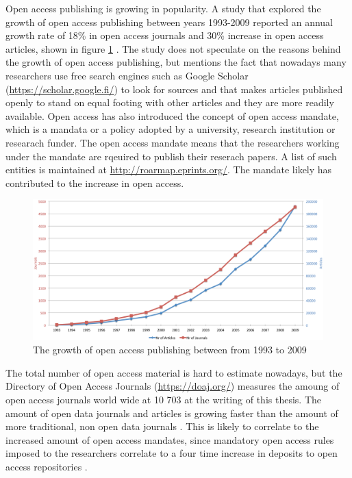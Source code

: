 Open access publishing is growing in popularity. A study that explored the
growth of open access publishing between years 1993-2009 reported an annual
growth rate of 18\% in open access journals and 30\% increase in open access
articles, shown in figure \ref{fig:oa_increase} \cite{laakso2011development}.
The study does not speculate on the reasons behind the growth of open access
publishing, but mentions the fact that nowadays many researchers use free
search engines such as Google Scholar (\url{https://scholar.google.fi/}) to
look for sources and that makes articles published openly to stand on equal
footing with other articles and they are more readily available. Open access
has also introduced the concept of open access mandate, which is a mandata or
a policy adopted by a university, research institution or researach funder.
The open access mandate means that the researchers working under the mandate
are rqeuired to publish their reserach papers. A list of such entities is
maintained at \url{http://roarmap.eprints.org/}. The mandate likely has
contributed to the increase in open access.

\begin{figure}
    \begin{centering}
        \includegraphics[width=\textwidth]{images/oa_increase}
    \end{centering}
    \caption{The growth of open access publishing between from 1993 to 2009 \cite{laakso2011development}}
    \label{fig:oa_increase}
\end{figure}

The total number of open access material is hard to estimate nowadays, but the
Directory of Open Access Journals (\url{https://doaj.org/}) measures the
amoung of open access journals world wide at 10 703 at the writing of this
thesis. The amount of open data journals and articles is growing faster than the amount
of more traditional, non open data journals \cite{laakso2011development}. This
is likely to correlate to the increased amount of open access mandates, since
mandatory open access rules imposed to the researchers correlate to a four
time increase in deposits to open access repositories
\cite{DBLP:journals/corr/SwanGHH15}.

